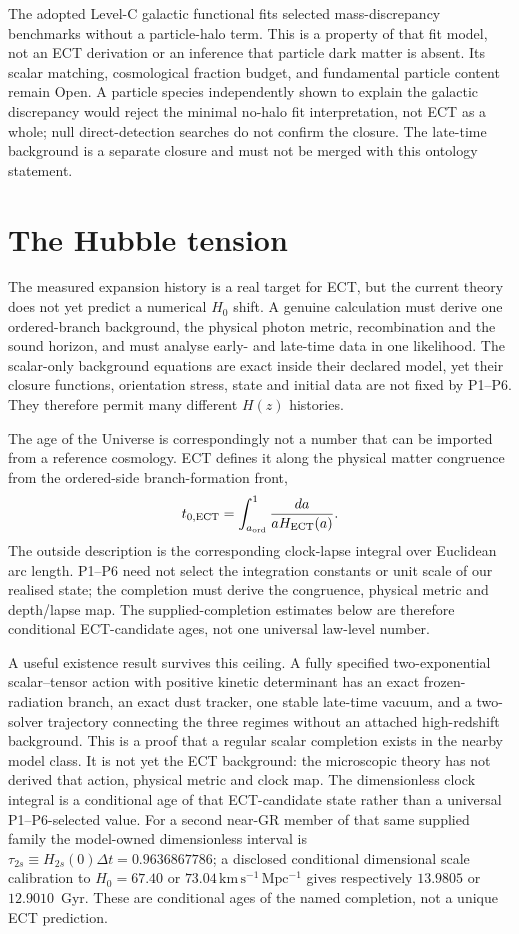 \documentclass[11pt,a4paper]{article}
\begin{document}
The adopted Level-C galactic functional fits selected mass-discrepancy benchmarks without a particle-halo term. This is a property of that fit model, not an ECT derivation or an inference that particle dark matter is absent. Its scalar matching, cosmological fraction budget, and fundamental particle content remain Open. A particle species independently shown to explain the galactic discrepancy would reject the minimal no-halo fit interpretation, not ECT as a whole; null direct-detection searches do not confirm the closure. The late-time background is a separate closure and must not be merged with this ontology statement.



\section{The Hubble tension}
\label{sec:pop_hubble}

The measured expansion history is a real target for ECT, but the current
theory does not yet predict a numerical $H_0$ shift.  A genuine calculation
must derive one ordered-branch background, the physical photon metric,
recombination and the sound horizon, and must analyse early- and late-time
data in one likelihood.  The scalar-only background equations are exact
inside their declared model, yet their closure functions, orientation stress,
state and initial data are not fixed by P1--P6.  They therefore permit many
different $H(z)$ histories.

The age of the Universe is correspondingly not a number that can be imported
from a reference cosmology.  ECT defines it along the physical matter
congruence from the ordered-side branch-formation front,
\[
 t_{0,\rm ECT}=\int_{a_{\rm ord}}^1{da\over aH_{\rm ECT}(a)}.
\]
The outside description is the corresponding clock-lapse integral over
Euclidean arc length.  P1--P6 need not select the integration constants or
unit scale of our realised state; the completion must derive the congruence,
physical metric and depth/lapse map.  The supplied-completion estimates below
are therefore conditional ECT-candidate ages, not one universal law-level
number.

A useful existence result survives this ceiling.  A fully specified
two-exponential scalar--tensor action with positive kinetic determinant has
an exact frozen-radiation branch, an exact dust tracker, one stable late-time
vacuum, and a two-solver trajectory connecting the three regimes without an
attached high-redshift background.  This is a proof that a regular scalar
completion exists in the nearby model class.  It is not yet the ECT
background: the microscopic theory has not derived that action, physical
metric and clock map.  The dimensionless clock integral is a conditional age
of that ECT-candidate state rather than a universal P1--P6-selected value.
For a second near-GR member of that same supplied family the model-owned
dimensionless interval is $\tau_{2s}\equiv H_{2s}(0)\Delta t=0.9636867786$; a disclosed conditional dimensional scale calibration
to $H_0=67.40$ or $73.04\,\mathrm{km\,s^{-1}\,Mpc^{-1}}$ gives respectively
$13.9805$ or $12.9010$~Gyr.  These are conditional ages of the named
completion, not a unique ECT prediction.
\end{document}
